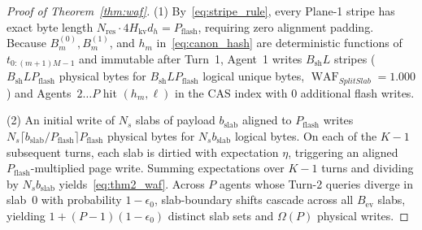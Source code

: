 \documentclass[final,5p,times,twocolumn]{elsarticle}
\theoremstyle{definition}
\theoremstyle{remark}
\newcommand{\SplitSlab}{\textup{\textsc{SplitSlab}}}
\newcommand{\WAF}{\operatorname{WAF}}
\def\SplitSlab{SplitSlab}%
\begin{document}
\begin{proof}[Proof of Theorem~\ref{thm:waf}]
(1) By~\eqref{eq:stripe_rule}, every Plane-1 stripe has exact byte length $N_{\mathrm{res}} \cdot 4 H_{\mathrm{kv}} d_h = P_{\mathrm{flash}}$, requiring zero alignment padding. Because $B_m^{(0)}, B_m^{(1)}$, and $h_m$ in~\eqref{eq:canon_hash} are deterministic functions of $t_{0:(m+1)M-1}$ and immutable after Turn~1, Agent~1 writes $B_{\mathrm{sh}} L$ stripes ($B_{\mathrm{sh}} L P_{\mathrm{flash}}$ physical bytes for $B_{\mathrm{sh}} L P_{\mathrm{flash}}$ logical unique bytes, $\WAF_{\SplitSlab} = 1.000$) and Agents~$2\dots P$ hit $(h_m,\ell)$ in the CAS index with $0$ additional flash writes.

(2) An initial write of $N_s$ slabs of payload $b_{\mathrm{slab}}$ aligned to $P_{\mathrm{flash}}$ writes $N_s \lceil b_{\mathrm{slab}}/P_{\mathrm{flash}}\rceil P_{\mathrm{flash}}$ physical bytes for $N_s b_{\mathrm{slab}}$ logical bytes. On each of the $K-1$ subsequent turns, each slab is dirtied with expectation $\eta$, triggering an aligned $P_{\mathrm{flash}}$-multiplied page write. Summing expectations over $K-1$ turns and dividing by $N_s b_{\mathrm{slab}}$ yields~\eqref{eq:thm2_waf}. Across $P$ agents whose Turn-2 queries diverge in slab~$0$ with probability $1 - \epsilon_0$, slab-boundary shifts cascade across all $B_{\mathrm{ev}}$ slabs, yielding $1 + (P-1)(1-\epsilon_0)$ distinct slab sets and $\Omega(P)$ physical writes.
\end{proof}



\end{document}

